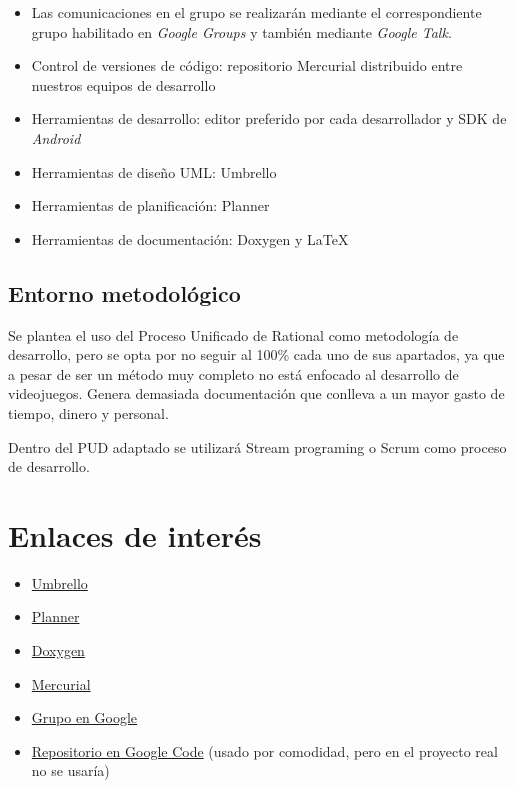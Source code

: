 \begin{itemize}

\item Las comunicaciones en el grupo se realizarán mediante el correspondiente grupo
habilitado en {\em Google Groups} y también mediante {\em Google Talk}.

\item Control de versiones de código: repositorio Mercurial distribuido entre
nuestros equipos de desarrollo

\item Herramientas de desarrollo: editor preferido por cada desarrollador y SDK
de {\em Android}

\item Herramientas de diseño UML: Umbrello

\item Herramientas de planificación: Planner

\item Herramientas de documentación: Doxygen y \LaTeX{}

\end{itemize}

\subsection{Entorno metodológico}

Se plantea el uso del Proceso Unificado de Rational como metodología
de desarrollo, pero se opta por no seguir al 100\% cada uno de sus
apartados, ya que a pesar de ser un método muy completo no está
enfocado al desarrollo de videojuegos. Genera demasiada documentación
que conlleva a un mayor gasto de tiempo, dinero y personal.

Dentro del PUD adaptado se utilizará Stream programing o Scrum como
proceso de desarrollo.

\section{Enlaces de interés}

\begin{itemize}
\item \href{http://uml.sourceforge.net/}{Umbrello}
\item \href{http://live.gnome.org/Planner}{Planner}
\item \href{http://www.doxygen.org}{Doxygen}
\item \href{http://mercurial.selenic.com/}{Mercurial}
\item \href{http://groups.google.com/group/uclm-iso2-p2-android?hl=es}{Grupo en Google}
\item \href{https://code.google.com/p/iso2-p2-android/}{Repositorio en Google
Code} (usado por comodidad, pero en el proyecto real no se usaría)
\end{itemize}
